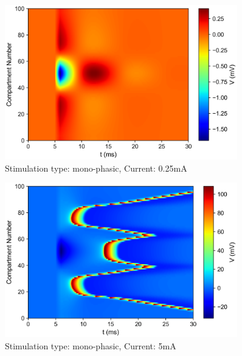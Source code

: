 \documentclass{scrartcl}
\begin{document}
\newpage
\begin{figure}[h]
	\centering
	\includegraphics[width=0.9\textwidth]{figures/potential_SimulationType.mono_amp0.00025.png}
	\caption{Stimulation type: mono-phasic, Current: 0.25mA}
	\label{fig:sim5}
\end{figure}
\begin{figure}[h!]
	\centering
	\includegraphics[width=0.9\textwidth]{figures/potential_SimulationType.mono_amp0.005.png}
	\caption{Stimulation type: mono-phasic, Current: 5mA}
	\label{fig:sim6}
\end{figure}
\end{document}
